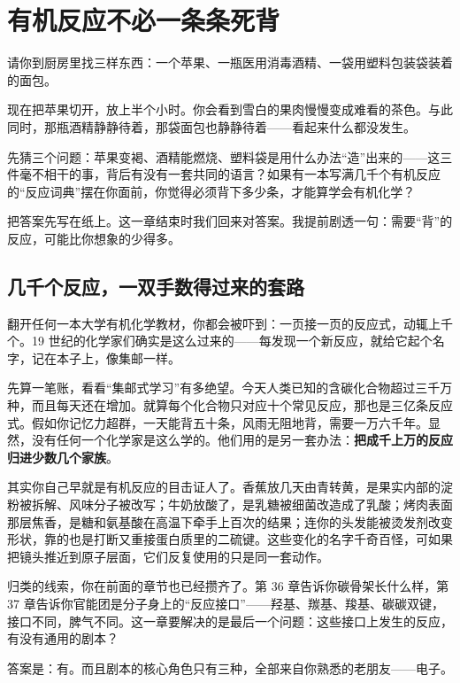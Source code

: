 \chapter{有机反应不必一条条死背}

\begin{kaichang}
请你到厨房里找三样东西：一个苹果、一瓶医用消毒酒精、一袋用塑料包装袋装着的面包。

现在把苹果切开，放上半个小时。你会看到雪白的果肉慢慢变成难看的茶色。与此同时，那瓶酒精静静待着，那袋面包也静静待着——看起来什么都没发生。

先猜三个问题：苹果变褐、酒精能燃烧、塑料袋是用什么办法“造”出来的——这三件毫不相干的事，背后有没有一套共同的语言？如果有一本写满几千个有机反应的“反应词典”摆在你面前，你觉得必须背下多少条，才能算学会有机化学？

把答案先写在纸上。这一章结束时我们回来对答案。我提前剧透一句：需要“背”的反应，可能比你想象的少得多。
\end{kaichang}

\section{几千个反应，一双手数得过来的套路}

翻开任何一本大学有机化学教材，你都会被吓到：一页接一页的反应式，动辄上千个。19 世纪的化学家们确实是这么过来的——每发现一个新反应，就给它起个名字，记在本子上，像集邮一样。

先算一笔账，看看“集邮式学习”有多绝望。今天人类已知的含碳化合物超过三千万种，而且每天还在增加。就算每个化合物只对应十个常见反应，那也是三亿条反应式。假如你记忆力超群，一天能背五十条，风雨无阻地背，需要一万六千年。显然，没有任何一个化学家是这么学的。他们用的是另一套办法：\textbf{把成千上万的反应归进少数几个家族}。

其实你自己早就是有机反应的目击证人了。香蕉放几天由青转黄，是果实内部的淀粉被拆解、风味分子被改写；牛奶放酸了，是乳糖被细菌改造成了乳酸；烤肉表面那层焦香，是糖和氨基酸在高温下牵手上百次的结果；连你的头发能被烫发剂改变形状，靠的也是打断又重接蛋白质里的二硫键。这些变化的名字千奇百怪，可如果把镜头推近到原子层面，它们反复使用的只是同一套动作。

归类的线索，你在前面的章节也已经攒齐了。第 36 章告诉你碳骨架长什么样，第 37 章告诉你官能团是分子身上的“反应接口”——羟基、羰基、羧基、碳碳双键，接口不同，脾气不同。这一章要解决的是最后一个问题：这些接口上发生的反应，有没有通用的剧本？

答案是：有。而且剧本的核心角色只有三种，全部来自你熟悉的老朋友——电子。

